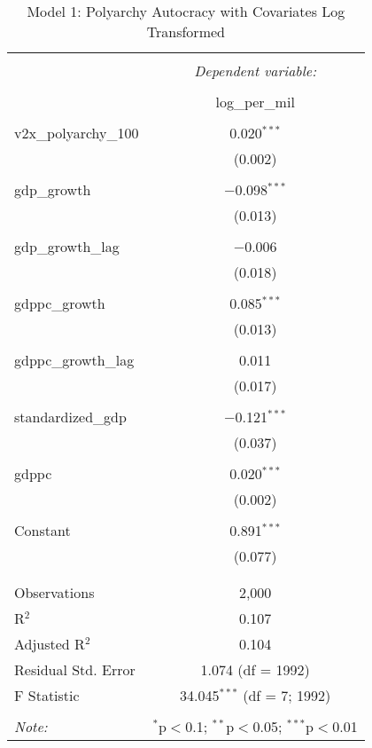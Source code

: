 
\begin{table}[!htbp] \centering 
  \caption{Model 1: Polyarchy Autocracy with Covariates Log Transformed} 
  \label{} 
\begin{tabular}{@{\extracolsep{5pt}}lc} 
\\[-1.8ex]\hline 
\hline \\[-1.8ex] 
 & \multicolumn{1}{c}{\textit{Dependent variable:}} \\ 
\cline{2-2} 
\\[-1.8ex] & log\_per\_mil \\ 
\hline \\[-1.8ex] 
 v2x\_polyarchy\_100 & 0.020$^{***}$ \\ 
  & (0.002) \\ 
  & \\ 
 gdp\_growth & $-$0.098$^{***}$ \\ 
  & (0.013) \\ 
  & \\ 
 gdp\_growth\_lag & $-$0.006 \\ 
  & (0.018) \\ 
  & \\ 
 gdppc\_growth & 0.085$^{***}$ \\ 
  & (0.013) \\ 
  & \\ 
 gdppc\_growth\_lag & 0.011 \\ 
  & (0.017) \\ 
  & \\ 
 standardized\_gdp & $-$0.121$^{***}$ \\ 
  & (0.037) \\ 
  & \\ 
 gdppc & 0.020$^{***}$ \\ 
  & (0.002) \\ 
  & \\ 
 Constant & 0.891$^{***}$ \\ 
  & (0.077) \\ 
  & \\ 
\hline \\[-1.8ex] 
Observations & 2,000 \\ 
R$^{2}$ & 0.107 \\ 
Adjusted R$^{2}$ & 0.104 \\ 
Residual Std. Error & 1.074 (df = 1992) \\ 
F Statistic & 34.045$^{***}$ (df = 7; 1992) \\ 
\hline 
\hline \\[-1.8ex] 
\textit{Note:}  & \multicolumn{1}{r}{$^{*}$p$<$0.1; $^{**}$p$<$0.05; $^{***}$p$<$0.01} \\ 
\end{tabular} 
\end{table} 
